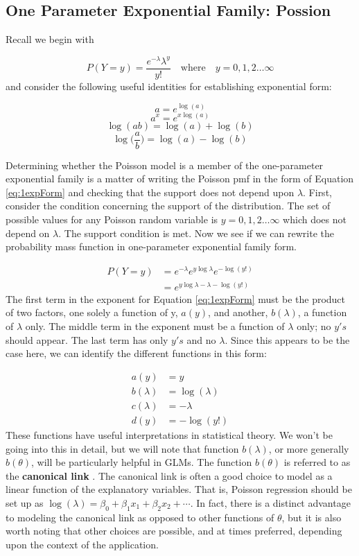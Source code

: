 \documentclass[
]{krantz}
\begin{document}
\hypertarget{one-parameter-exponential-family-possion}{%
\subsection{One Parameter Exponential Family: Possion}\label{one-parameter-exponential-family-possion}}

Recall we begin with

\[
P(Y=y)=\frac{e^{-\lambda}{\lambda}^y}{y!}\quad \textrm{where}\quad y=0,1,2\ldots\infty
\]
and consider the following useful identities for establishing exponential form:

\[a=e^{\log(a)} \]
\[a^x = e^{x\log(a)}\]
\[\log(ab)=\log(a)+\log(b)\]
\[\log\Big(\frac{a}{b}\Big)=\log(a)-\log(b)\]

Determining whether the Poisson model is a member of the one-parameter exponential family is a matter of writing the Poisson pmf in the form of Equation \eqref{eq:1expForm} and checking that the support does not depend upon \(\lambda\). First, consider the condition concerning the support of the distribution. The set of possible values for any Poisson random variable is \(y=0,1,2\ldots\infty\) which does not depend on \(\lambda\). The support condition is met. Now we see if we can rewrite the probability mass function in one-parameter exponential family form.

\begin{align*}
 P(Y=y)&= {e^{-\lambda}e^{y\log \lambda}e^{-\log (y!)}} \nonumber \\
       &= e^{y\log \lambda-\lambda-\log (y!)}
 \end{align*}
The first term in the exponent for Equation \eqref{eq:1expForm} must be the product of two factors, one solely a function of y, \(a(y)\), and another, \(b(\lambda)\), a function of \(\lambda\) only. The middle term in the exponent must be a function of \(\lambda\) only; no \(y's\) should appear. The last term has only \(y's\) and no \(\lambda\). Since this appears to be the case here, we can identify the different functions in this form:

\begin{align*}
a(y)&=y \\
b(\lambda)&=\log(\lambda) \\
c(\lambda)&=-\lambda \\
d(y)&=-\log (y!)
\label{eq:diffunc}
\end{align*}
These functions have useful interpretations in statistical theory. We won't be going into this in detail, but we will note that function \(b(\lambda)\), or more generally \(b(\theta)\), will be particularly helpful in GLMs. The function \(b(\theta)\) is referred to as the \textbf{canonical link} . The canonical link is often a good choice to model as a linear function of the explanatory variables. That is, Poisson regression should be set up as \(\log(\lambda)=\beta_0+\beta_1x_1+\beta_2x_2+\cdots\). In fact, there is a distinct advantage to modeling the canonical link as opposed to other functions of \(\theta\), but it is also worth noting that other choices are possible, and at times preferred, depending upon the context of the application.
\end{document}
